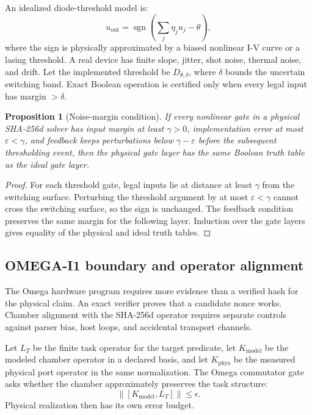 \documentclass[11pt]{article}
\newtheorem{proposition}[theorem]{Proposition}
\theoremstyle{definition}
\theoremstyle{remark}
\newcommand{\sgn}{\operatorname{sgn}}
\begin{document}
An idealized diode-threshold model is:
\[
u_{\mathrm{out}}=\sgn\!\left(\sum_j \eta_j u_j-\theta\right),
\]
where the sign is physically approximated by a biased nonlinear I-V curve or a
lasing threshold. A real device has finite slope, jitter, shot noise, thermal
noise, and drift. Let the implemented threshold be \(D_{\theta,\delta}\), where
\(\delta\) bounds the uncertain switching band. Exact Boolean operation is
certified only when every legal input has margin \(>\delta\).

\begin{proposition}[Noise-margin condition]
If every nonlinear gate in a physical SHA-256d solver has input margin at least
\(\gamma>0\), implementation error at most \(\varepsilon<\gamma\), and feedback
keeps perturbations below \(\gamma-\varepsilon\) before the subsequent
thresholding event, then the physical gate layer has the same Boolean truth
table as the ideal gate layer.
\end{proposition}

\begin{proof}
For each threshold gate, legal inputs lie at distance at least \(\gamma\) from
the switching surface. Perturbing the threshold argument by at most
\(\varepsilon<\gamma\) cannot cross the switching surface, so the sign is
unchanged. The feedback condition preserves the same margin for the following layer.
Induction over the gate layers gives equality of the physical and ideal truth
tables.
\end{proof}

\subsection{OMEGA-I1 boundary and operator alignment}

The Omega hardware program requires more evidence than a verified hash for the
physical claim. An exact verifier proves that a candidate nonce works. Chamber
alignment with the SHA-256d operator requires separate controls against parser
bias, host loops, and accidental transport channels.

Let \(L_T\) be the finite task operator for the target predicate, let
\(K_{\mathrm{model}}\) be the modeled chamber operator in a declared basis, and
let \(K_{\mathrm{phys}}\) be the measured physical port operator in the same
normalization. The Omega commutator gate asks whether the chamber approximately
preserves the task structure:
\[
\lVert [K_{\mathrm{model}},L_T]\rVert\le \epsilon .
\]
Physical realization then has its own error budget.
\end{document}
